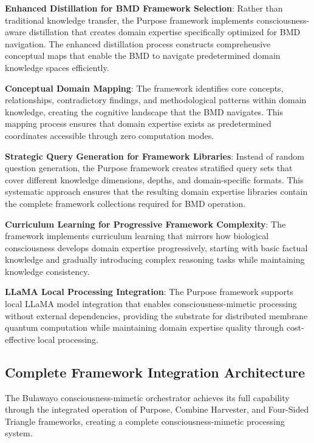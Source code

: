 \documentclass[12pt,a4paper]{article}
\begin{document}
\textbf{Enhanced Distillation for BMD Framework Selection}: Rather than traditional knowledge transfer, the Purpose framework implements consciousness-aware distillation that creates domain expertise specifically optimized for BMD navigation. The enhanced distillation process constructs comprehensive conceptual maps that enable the BMD to navigate predetermined domain knowledge spaces efficiently.

\textbf{Conceptual Domain Mapping}: The framework identifies core concepts, relationships, contradictory findings, and methodological patterns within domain knowledge, creating the cognitive landscape that the BMD navigates. This mapping process ensures that domain expertise exists as predetermined coordinates accessible through zero computation modes.

\textbf{Strategic Query Generation for Framework Libraries}: Instead of random question generation, the Purpose framework creates stratified query sets that cover different knowledge dimensions, depths, and domain-specific formats. This systematic approach ensures that the resulting domain expertise libraries contain the complete framework collections required for BMD operation.

\textbf{Curriculum Learning for Progressive Framework Complexity}: The framework implements curriculum learning that mirrors how biological consciousness develops domain expertise progressively, starting with basic factual knowledge and gradually introducing complex reasoning tasks while maintaining knowledge consistency.

\textbf{LLaMA Local Processing Integration}: The Purpose framework supports local LLaMA model integration that enables consciousness-mimetic processing without external dependencies, providing the substrate for distributed membrane quantum computation while maintaining domain expertise quality through cost-effective local processing.

\subsection{Complete Framework Integration Architecture}

The Bulawayo consciousness-mimetic orchestrator achieves its full capability through the integrated operation of Purpose, Combine Harvester, and Four-Sided Triangle frameworks, creating a complete consciousness-mimetic processing system.
\end{document}
